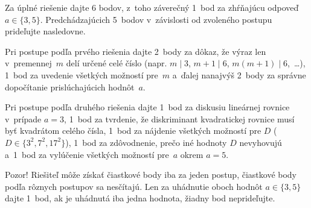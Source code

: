 {\nobreak\medskip\petit\noindent
Za úplné riešenie dajte 6 bodov, z~toho záverečný 1~bod za zhŕňajúcu
odpoveď $a\in\{3, 5\}$. Predchádzajúcich 5~bodov v~závislosti
od zvoleného postupu prideľujte nasledovne.

Pri postupe podľa prvého riešenia dajte 2~body za dôkaz, že
výraz len v~premennej~$m$ delí určené celé číslo (napr. $m\mid3$, $m+1\mid6$,
$m(m+1)\mid 6$,~\dots),
1~bod za uvedenie všetkých možností pre~$m$
a~ďalej nanajvýš 2~body za správne dopočítanie prislúchajúcich hodnôt~$a$.

Pri postupe podľa druhého riešenia dajte 1~bod za diskusiu lineárnej
rovnice v~prípade $a=3$, 1~bod za tvrdenie, že diskriminant kvadratickej
rovnice musí byť kvadrátom celého čísla, 1~bod za nájdenie všetkých
možností pre $D$ ($D\in\{3^2, 7^2, 17^2\}$), 1~bod za zdôvodnenie, prečo
iné hodnoty $D$ nevyhovujú a~1~bod za vylúčenie všetkých možností pre~$a$
okrem $a=5$.

Pozor! Riešiteľ môže získať čiastkové body iba za jeden
postup, čiastkové body podľa rôznych postupov sa nesčítajú.
Len za uhádnutie oboch hodnôt $a\in\{3, 5\}$ dajte 1~bod,
ak je uhádnutá iba jedna hodnota, žiadny bod neprideľujte.

\endpetit
}

